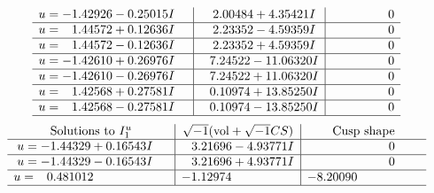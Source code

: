 \documentclass[1p]{elsarticle_modified}
\theoremstyle{definition}
\newcommand{\I}{\sqrt{-1}}
\begin{document}
$$\begin{array}{c|c|c}
\begin{aligned}
u &= -1.42926 - 0.25015 I\end{aligned}
 & \phantom{-}2.00484 + 4.35421 I & \phantom{-0.000000 } 0 \\ \hline\begin{aligned}
u &= \phantom{-}1.44572 + 0.12636 I\end{aligned}
 & \phantom{-}2.23352 - 4.59359 I & \phantom{-0.000000 } 0 \\ \hline\begin{aligned}
u &= \phantom{-}1.44572 - 0.12636 I\end{aligned}
 & \phantom{-}2.23352 + 4.59359 I & \phantom{-0.000000 } 0 \\ \hline\begin{aligned}
u &= -1.42610 + 0.26976 I\end{aligned}
 & \phantom{-}7.24522 - 11.06320 I & \phantom{-0.000000 } 0 \\ \hline\begin{aligned}
u &= -1.42610 - 0.26976 I\end{aligned}
 & \phantom{-}7.24522 + 11.06320 I & \phantom{-0.000000 } 0 \\ \hline\begin{aligned}
u &= \phantom{-}1.42568 + 0.27581 I\end{aligned}
 & \phantom{-}0.10974 + 13.85250 I & \phantom{-0.000000 } 0 \\ \hline\begin{aligned}
u &= \phantom{-}1.42568 - 0.27581 I\end{aligned}
 & \phantom{-}0.10974 - 13.85250 I & \phantom{-0.000000 } 0\\
 \hline 
 \end{array}$$\newpage$$\begin{array}{c|c|c}  
\text{Solutions to }I^u_{1}& \I (\text{vol} + \sqrt{-1}CS) & \text{Cusp shape}\\
 \hline 
\begin{aligned}
u &= -1.44329 + 0.16543 I\end{aligned}
 & \phantom{-}3.21696 - 4.93771 I & \phantom{-0.000000 } 0 \\ \hline\begin{aligned}
u &= -1.44329 - 0.16543 I\end{aligned}
 & \phantom{-}3.21696 + 4.93771 I & \phantom{-0.000000 } 0 \\ \hline\begin{aligned}
u &= \phantom{-}0.481012\phantom{ +0.000000I}\end{aligned}
 & -1.12974\phantom{ +0.000000I} & -8.20090\phantom{ +0.000000I}\\
 \hline 
 \end{array}$$\newpage
\end{document}
